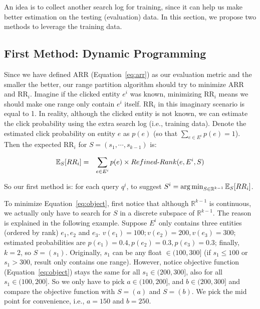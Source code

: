 An idea is to collect another search log for training, since it can help us make better estimation on the testing (evaluation) data. In this section, we propose two methods to leverage the training data. 

\subsection{First Method: Dynamic Programming}
\label{sec:firstmethod}
Since we have defined ARR (Equation~\ref{eq:arr}) as our evaluation metric and the smaller the better, our range partition algorithm should try to minimize ARR and RR$_i$. Imagine if the clicked entity $e^i$ was known, minimizing RR$_i$ means we should make one range only contain $e^i$ itself. RR$_i$ in this imaginary scenario is equal to 1. In reality, although the clicked entity is not known, we can estimate the click probability using the extra search log (i.e., training data). Denote the estimated click probability on entity $e$ as $p(e)$ (so that $\sum_{e\in E^i} p(e) = 1$). Then the expected RR$_i$ for $S=(s_1, \cdots, s_{k-1})$ is:

\vspace{-0.09in}
\begin{eqnarray}
\mathbb{E}_{S}[RR_i] &=& \sum_{e\in E^i} p(e) \times \mathop{\mbox{$Refined$-$Rank$}}(e, E^i, S)\label{eq:object}
\end{eqnarray}
\vspace{-0.09in}

So our first method is: for each query $q^i$, to suggest $S^i=\operatorname*{arg\,min}_{S\in \mathbb{R}^{k-1}} \mathbb{E}_{S}[RR_i]$.  

To minimize Equation~\ref{eq:object}, first notice that although $\mathbb{R}^{k-1}$ is continuous, we actually only have to search for $S$ in a discrete subspace of $\mathbb{R}^{k-1}$. The reason is explained in the following example. Suppose $E^i$ only contains three entities (ordered by rank) $e_1,e_2$ and $e_3$. $v(e_1)=100; v(e_2)=200, v(e_3)=300$; estimated probabilities are $p(e_1) = 0.4,\allowbreak p(e_2) = 0.3, \allowbreak p(e_3) = 0.3$; finally, $k=2$, so $S=(s_1)$. Originally, $s_1$ can be any float $\in (100, 300]$ (if $s_1\leq 100$ or $s_1 > 300$, result only contains one range). However, notice objective function (Equation~\ref{eq:object}) stays the same for all $s_1\in (200, 300]$, also for all $s_1\in (100, 200]$. So we only have to pick $a\in(100, 200]$, and $b\in(200, 300]$ and compare the objective function with $S=(a)$ and $S=(b)$. We pick the mid point for convenience, i.e., $a=150$ and $b=250$.

